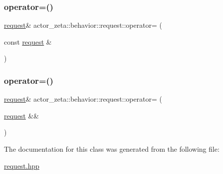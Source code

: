 \mbox{\label{classactor__zeta_1_1behavior_1_1request_adb7544a3e7e43b00f458b794cab09227}} 
\subsubsection{\texorpdfstring{operator=()}{operator=()}\hspace{0.1cm}{\footnotesize\ttfamily [1/2]}}
{\footnotesize\ttfamily \hyperlink{classactor__zeta_1_1behavior_1_1request}{request}\& actor\+\_\+zeta\+::behavior\+::request\+::operator= (\begin{DoxyParamCaption}\item[{const \hyperlink{classactor__zeta_1_1behavior_1_1request}{request} \&}]{ }\end{DoxyParamCaption})\hspace{0.3cm}{\ttfamily [default]}}

\mbox{\label{classactor__zeta_1_1behavior_1_1request_ae254fec16d1b066e99d56d56a950bbef}} 
\subsubsection{\texorpdfstring{operator=()}{operator=()}\hspace{0.1cm}{\footnotesize\ttfamily [2/2]}}
{\footnotesize\ttfamily \hyperlink{classactor__zeta_1_1behavior_1_1request}{request}\& actor\+\_\+zeta\+::behavior\+::request\+::operator= (\begin{DoxyParamCaption}\item[{\hyperlink{classactor__zeta_1_1behavior_1_1request}{request} \&\&}]{ }\end{DoxyParamCaption})\hspace{0.3cm}{\ttfamily [default]}}



The documentation for this class was generated from the following file\+:\begin{DoxyCompactItemize}
\item 
\hyperlink{request_8hpp}{request.\+hpp}\end{DoxyCompactItemize}
